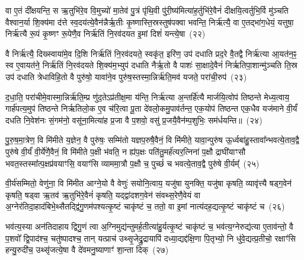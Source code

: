 वा ए॒तं दी᳚क्षयन्ति॒ स ऋ॒तुभि॑रे॒व वि॒मुच्यो॑ मा॒तेव॑ पु॒त्रं पृ॑थि॒वी पु॑री॒ष्य॑मित्या॑ह॒र्तुभि॑रे॒वैनं॑ दीक्षयि॒त्वर्तुभि॒र्वि मु॑ञ्चति वैश्वान॒र्या शि॒क्य॑मा द॑त्ते स्व॒दय॑त्ये॒वैन॑न्नैर्\mbox{}ऋ॒तीः कृ॒ष्णास्ति॒स्रस्तुष॑पक्वा भवन्ति॒ निर्\mbox{}ऋ॑त्यै॒ वा ए॒तद्भा॑ग॒धेयं॒ यत्तुषा॒ निर्\mbox{}ऋ॑त्यै रू॒पं कृ॒ष्णꣳ रू॒पेणै॒व निर्\mbox{}ऋ॑तिं नि॒रव॑दयत इ॒मां दिशं॑ यन्त्ये॒षा~(२२)

वै निर्\mbox{}ऋ॑त्यै॒ दिख्स्वाया॑मे॒व दि॒शि निर्\mbox{}ऋ॑तिं नि॒रव॑दयते॒ स्वकृ॑त॒ इरि॑ण॒ उप॑ दधाति प्रद॒रे वै॒तद्वै निर्\mbox{}ऋ॑त्या आ॒यत॑न॒ꣴ॒ स्व ए॒वायत॑ने॒ निर्\mbox{}ऋ॑तिं नि॒रव॑दयते शि॒क्य॑म॒भ्युप॑ दधाति नैर्\mbox{}ऋ॒तो वै पाशः॑ सा॒क्षादे॒वैनं॑ निर्\mbox{}ऋतिपा॒शान्मु॑ञ्चति ति॒स्र उप॑ दधाति त्रेधाविहि॒तो वै पुरु॑षो॒ यावा॑ने॒व पुरु॑ष॒स्तस्मा॒न्निर्\mbox{}ऋ॑ति॒मव॑ यजते॒ परा॑ची॒रुप॑~(२३)

द॒धा॒ति॒ परा॑चीमे॒वास्मा॒न्निर्\mbox{}ऋ॑ति॒म्प्र णु॑द॒ते\-ऽप्र॑तीक्ष॒मा य॑न्ति॒ निर्\mbox{}ऋ॑त्या अ॒न्तर्\mbox{}हि॑त्यै मार्जयि॒त्वोप॑ तिष्ठन्ते मेध्य॒त्वाय॒ गार्\mbox{}ह॑पत्य॒मुप॑ तिष्ठन्ते निर्\mbox{}ऋतिलो॒क ए॒व च॑रि॒त्वा पू॒ता दे॑वलो॒कमु॒पाव॑र्तन्त॒ एक॒योप॑ तिष्ठन्त एक॒धैव यज॑माने वी॒र्यं॑ दधति नि॒वेश॑नः सं॒गम॑नो॒ वसू॑ना॒मित्या॑ह प्र॒जा वै प॒शवो॒ वसु॑ प्र॒जयै॒वैन॑म्प॒शुभिः॒ सम॑र्धयन्ति॥~(२४)

{\anuvakamend[{ऋ॒तुभि॑रे॒षा परा॑ची॒रुपा॒ष्टाच॑त्वारिꣳशच्च}]}%

पु॒रु॒ष॒मा॒त्रेण॒ वि मि॑मीते य॒ज्ञेन॒ वै पुरु॑षः॒ सम्मि॑तो यज्ञप॒रुषै॒वैनं॒ वि मि॑मीते॒ यावा॒न्पुरु॑ष ऊ॒र्ध्वबा॑हु॒स्तावा᳚न्भव\-त्ये॒ताव॒द्वै पुरु॑षे वी॒र्यं॑ वी॒र्ये॑णै॒वैनं॒ वि मि॑मीते प॒क्षी भ॑वति॒ न ह्य॑प॒क्षः पति॑तु॒मर्\mbox{}ह॑त्यर॒त्निना॑ प॒क्षौ द्राघी॑याꣳसौ भवत॒स्तस्मा᳚त्प॒क्षप्र॑वयाꣳसि॒ वयाꣳ॑सि व्याममा॒त्रौ प॒क्षौ च॒ पुच्छं॑ च भवत्ये॒ताव॒द्वै पुरु॑षे वी॒र्यम्᳚~(२५)

वी॒र्य॑सम्मितो॒ वेणु॑ना॒ वि मि॑मीत आग्ने॒यो वै वेणुः॑ सयोनि॒त्वाय॒ यजु॑षा युनक्ति॒ यजु॑षा कृषति॒ व्यावृ॑त्त्यै षड्ग॒वेन॑ कृषति॒ षड्वा ऋ॒तव॑ ऋ॒तुभि॑रे॒वैनं॑ कृषति॒ यद्द्वा॑दशग॒वेन॑ संवथ्स॒रेणै॒वेयं वा अ॒ग्नेर॑तिदा॒हाद॑बिभे॒थ्सैतद्द्वि॑गु॒णम॑पश्यत्कृ॒ष्टं चाकृ॑ष्टं च॒ ततो॒ वा इ॒मां नात्य॑दह॒द्यत्कृ॒ष्टं चाकृ॑ष्टं च~(२६)

भव॑त्य॒स्या अन॑तिदाहाय द्विगु॒णं त्वा अ॒ग्निमुद्य॑न्तुमर्\mbox{}ह॒तीत्या॑हु॒र्यत्कृ॒ष्टं चाकृ॑ष्टं च॒ भव॑त्य॒ग्नेरुद्य॑त्या ए॒ताव॑न्तो॒ वै प॒शवो᳚ द्वि॒पाद॑श्च॒ चतु॑ष्पादश्च॒ तान् यत्प्राच॑ उथ्सृ॒जेद्रु॒द्रायापि॑ दध्या॒द्यद्द॑क्षि॒णा पि॒तृभ्यो॒ नि धु॑वे॒द्यत्प्र॒तीचो॒ रक्षाꣳ॑सि हन्यु॒रुदी॑च॒ उथ्सृ॑जत्ये॒षा वै दे॑वमनु॒ष्याणाꣳ॑ शा॒न्ता दिक्~(२७)

